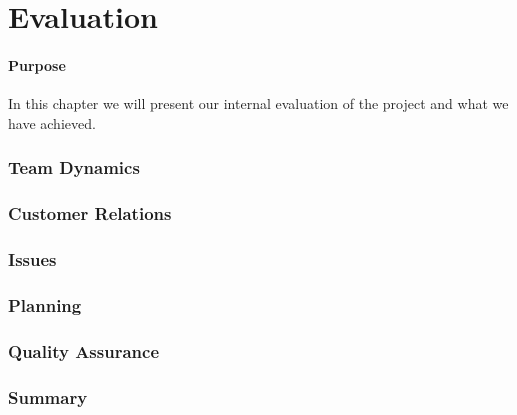 \chapter{Evaluation}

\minitoc

\subsubsection{Purpose}
In this chapter we will present our internal evaluation of the project and what we have achieved.

\clearpage

\subsection{Team Dynamics}


\subsection{Customer Relations}


\subsection{Issues}


\subsection{Planning}


\subsection{Quality Assurance}


\subsection{Summary}